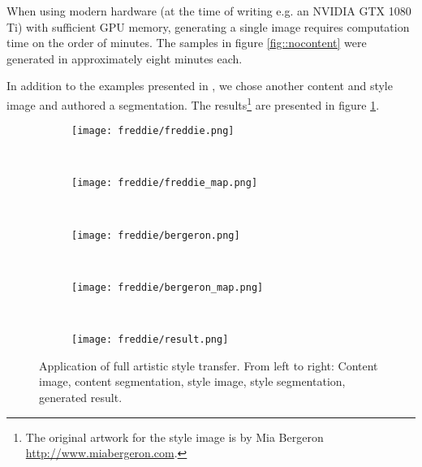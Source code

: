 When using modern hardware (at the time of writing e.g. an NVIDIA GTX 1080 Ti) with sufficient GPU memory, generating a single image requires computation time on the order of minutes. The samples in figure \ref{fig::nocontent} were generated in approximately eight minutes each. 

In addition to the examples presented in \cite{doodles2016}, we chose another content and style image and authored a segmentation. The results\footnote{The original artwork for the style image is by Mia Bergeron \url{http://www.miabergeron.com}.} are presented in figure \ref{fig::freddie}.

\begin{figure}
	\begin{subfigure}[t]{0.18\textwidth}
		\centering
		\texttt{[image: freddie/freddie.png]}
	\end{subfigure}%
	~
	\begin{subfigure}[t]{0.18\textwidth}
		\centering
		\texttt{[image: freddie/freddie\_map.png]}
	\end{subfigure}%
	~
	\begin{subfigure}[t]{0.18\textwidth}
		\centering
		\texttt{[image: freddie/bergeron.png]}
	\end{subfigure}
	~
	\begin{subfigure}[t]{0.18\textwidth}
		\centering
		\texttt{[image: freddie/bergeron\_map.png]}
	\end{subfigure}
	~
	\begin{subfigure}[t]{0.18\textwidth}
		\centering
		\texttt{[image: freddie/result.png]}
	\end{subfigure}
	
	\caption[]{Application of full artistic style transfer. From left to right: Content image, content segmentation, style image, style segmentation, generated result.}
	\label{fig::freddie}
\end{figure}